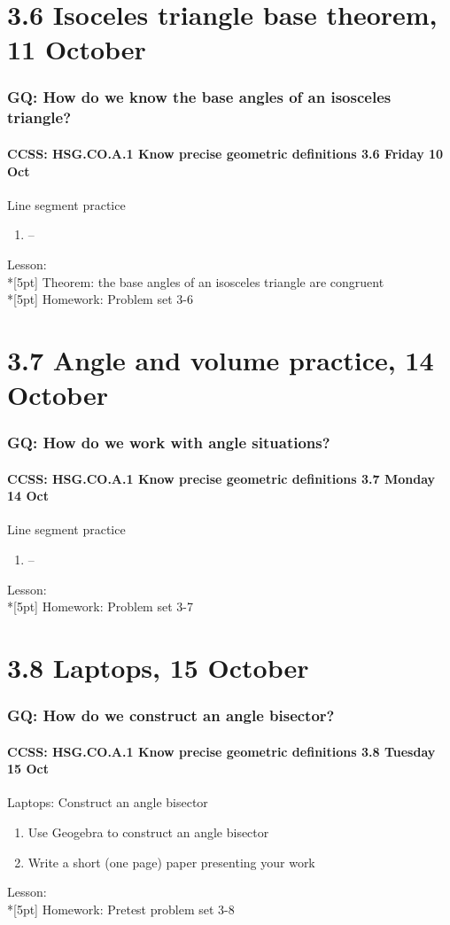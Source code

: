 \documentclass{beamer}
\begin{document}
  \section{3.6 Isoceles triangle base theorem, 11 October}
    \frame
    {
      \frametitle{GQ: How do we know the base angles of an isosceles triangle?}
      \framesubtitle{CCSS: HSG.CO.A.1 Know precise geometric definitions \hfill \alert{3.6 Friday 10 Oct}}

      \begin{block}{Line segment practice}
      \begin{enumerate}
        \item --
      \end{enumerate}
      \end{block}
      Lesson:   \\*[5pt]
      Theorem: the base angles of an isosceles triangle are congruent\\*[5pt]
      Homework: Problem set 3-6
    }

  \section{3.7 Angle and volume practice, 14 October}
    \frame
    {
      \frametitle{GQ: How do we work with angle situations?}
      \framesubtitle{CCSS: HSG.CO.A.1 Know precise geometric definitions \hfill \alert{3.7 Monday 14 Oct}}

      \begin{block}{Line segment practice}
      \begin{enumerate}
        \item --
      \end{enumerate}
      \end{block}
      Lesson:   \\*[5pt]
      Homework: Problem set 3-7
    }

  \section{3.8 Laptops, 15 October}
    \frame
    {
      \frametitle{GQ: How do we construct an angle bisector?}
      \framesubtitle{CCSS: HSG.CO.A.1 Know precise geometric definitions \hfill \alert{3.8 Tuesday 15 Oct}}

      \begin{block}{Laptops: Construct an angle bisector}
      \begin{enumerate}
        \item Use Geogebra to construct an angle bisector
        \item Write a short (one page) paper presenting your work
      \end{enumerate}
      \end{block}
      Lesson:   \\*[5pt]
      Homework: Pretest problem set 3-8
    }
\end{document}
